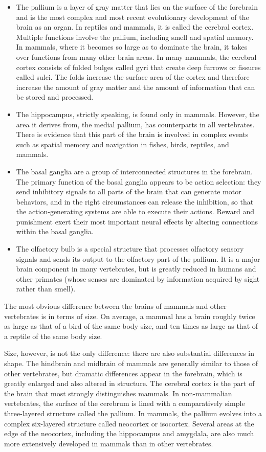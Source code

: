 \documentclass[]{book}
\begin{document}
\begin{itemize}
\item
  The pallium is a layer of gray matter that lies on the surface of the forebrain and is the most complex and most recent evolutionary development of the brain as an organ. In reptiles and mammals, it is called the cerebral cortex. Multiple functions involve the pallium, including smell and spatial memory. In mammals, where it becomes so large as to dominate the brain, it takes over functions from many other brain areas. In many mammals, the cerebral cortex consists of folded bulges called gyri that create deep furrows or fissures called sulci. The folds increase the surface area of the cortex and therefore increase the amount of gray matter and the amount of information that can be stored and processed.
\item
  The hippocampus, strictly speaking, is found only in mammals. However, the area it derives from, the medial pallium, has counterparts in all vertebrates. There is evidence that this part of the brain is involved in complex events such as spatial memory and navigation in fishes, birds, reptiles, and mammals.
\item
  The basal ganglia are a group of interconnected structures in the forebrain. The primary function of the basal ganglia appears to be action selection: they send inhibitory signals to all parts of the brain that can generate motor behaviors, and in the right circumstances can release the inhibition, so that the action-generating systems are able to execute their actions. Reward and punishment exert their most important neural effects by altering connections within the basal ganglia.
\item
  The olfactory bulb is a special structure that processes olfactory sensory signals and sends its output to the olfactory part of the pallium. It is a major brain component in many vertebrates, but is greatly reduced in humans and other primates (whose senses are dominated by information acquired by sight rather than smell).
\end{itemize}

The most obvious difference between the brains of mammals and other vertebrates is in terms of size. On average, a mammal has a brain roughly twice as large as that of a bird of the same body size, and ten times as large as that of a reptile of the same body size.

Size, however, is not the only difference: there are also substantial differences in shape. The hindbrain and midbrain of mammals are generally similar to those of other vertebrates, but dramatic differences appear in the forebrain, which is greatly enlarged and also altered in structure. The cerebral cortex is the part of the brain that most strongly distinguishes mammals. In non-mammalian vertebrates, the surface of the cerebrum is lined with a comparatively simple three-layered structure called the pallium. In mammals, the pallium evolves into a complex six-layered structure called neocortex or isocortex. Several areas at the edge of the neocortex, including the hippocampus and amygdala, are also much more extensively developed in mammals than in other vertebrates.
\end{document}
